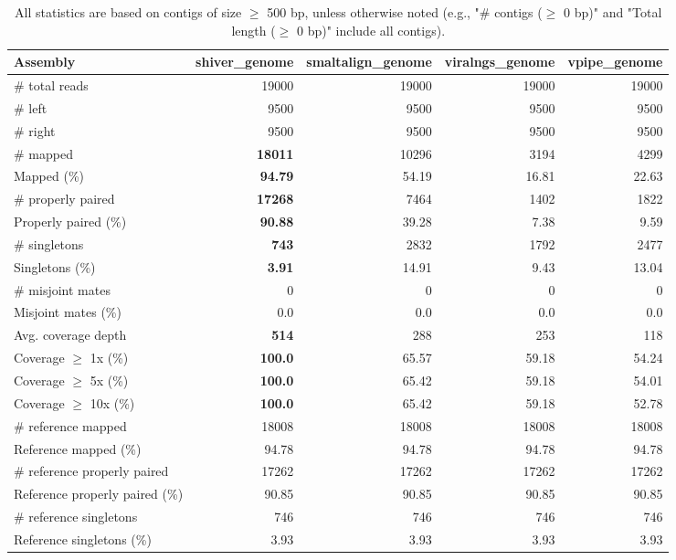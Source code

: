 \documentclass[12pt,a4paper]{article}
\begin{document}
\begin{table}[ht]
\begin{center}
\caption{All statistics are based on contigs of size $\geq$ 500 bp, unless otherwise noted (e.g., "\# contigs ($\geq$ 0 bp)" and "Total length ($\geq$ 0 bp)" include all contigs).}
\begin{tabular}{|l*{4}{|r}|}
\hline
Assembly & shiver\_genome & smaltalign\_genome & viralngs\_genome & vpipe\_genome \\ \hline
\# total reads & 19000 & 19000 & 19000 & 19000 \\ \hline
\# left & 9500 & 9500 & 9500 & 9500 \\ \hline
\# right & 9500 & 9500 & 9500 & 9500 \\ \hline
\# mapped & {\bf 18011} & 10296 & 3194 & 4299 \\ \hline
Mapped (\%) & {\bf 94.79} & 54.19 & 16.81 & 22.63 \\ \hline
\# properly paired & {\bf 17268} & 7464 & 1402 & 1822 \\ \hline
Properly paired (\%) & {\bf 90.88} & 39.28 & 7.38 & 9.59 \\ \hline
\# singletons & {\bf 743} & 2832 & 1792 & 2477 \\ \hline
Singletons (\%) & {\bf 3.91} & 14.91 & 9.43 & 13.04 \\ \hline
\# misjoint mates & 0 & 0 & 0 & 0 \\ \hline
Misjoint mates (\%) & 0.0 & 0.0 & 0.0 & 0.0 \\ \hline
Avg. coverage depth & {\bf 514} & 288 & 253 & 118 \\ \hline
Coverage $\geq$ 1x (\%) & {\bf 100.0} & 65.57 & 59.18 & 54.24 \\ \hline
Coverage $\geq$ 5x (\%) & {\bf 100.0} & 65.42 & 59.18 & 54.01 \\ \hline
Coverage $\geq$ 10x (\%) & {\bf 100.0} & 65.42 & 59.18 & 52.78 \\ \hline
\# reference mapped & 18008 & 18008 & 18008 & 18008 \\ \hline
Reference mapped (\%) & 94.78 & 94.78 & 94.78 & 94.78 \\ \hline
\# reference properly paired & 17262 & 17262 & 17262 & 17262 \\ \hline
Reference properly paired (\%) & 90.85 & 90.85 & 90.85 & 90.85 \\ \hline
\# reference singletons & 746 & 746 & 746 & 746 \\ \hline
Reference singletons (\%) & 3.93 & 3.93 & 3.93 & 3.93 \\ \hline

\end{tabular}
\end{center}
\end{table}
\end{document}
